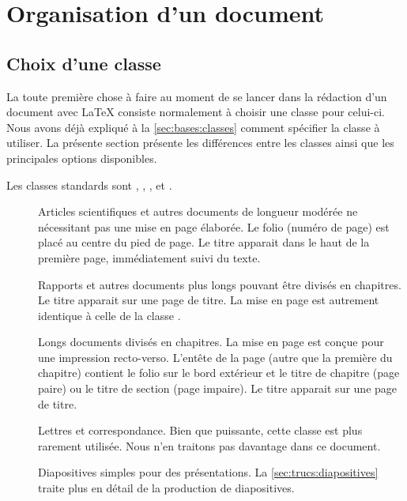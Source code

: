 \chapter{Organisation d'un document}
\label{chap:organisation}


\section{Choix d'une classe}
\label{sec:organisation:classe}

La toute première chose à faire au moment de se lancer dans la
rédaction d'un document avec {\LaTeX} consiste normalement à choisir
une classe pour celui-ci. Nous avons déjà expliqué à la
\autoref{sec:bases:classes} comment spécifier la classe à utiliser. La
présente section présente les différences entre les classes ainsi que
les principales options disponibles.

Les classes standards sont , ,
,  et .

\begin{description}
\item[\normalfont{}] Articles scientifiques et autres
  documents de longueur modérée ne nécessitant pas une mise en page
  élaborée. Le folio (numéro de page) est placé au centre du pied de
  page. Le titre apparait dans le haut de la première page,
  immédiatement suivi du texte.
\item[\normalfont{}] Rapports et autres documents plus
  longs pouvant être divisés en chapitres. Le titre apparait sur une
  page de titre. La mise en page est autrement identique à celle de la
  classe .
\item[\normalfont{}] Longs documents divisés en chapitres.
  La mise en page est conçue pour une impression recto-verso. L'entête
  de la page (autre que la première du chapitre) contient le folio sur
  le bord extérieur et le titre de chapitre (page paire) ou le titre
  de section (page impaire). Le titre apparait sur une page de titre.
\item[\normalfont{}] Lettres et correspondance. Bien que
  puissante, cette classe est plus rarement utilisée. Nous n'en traitons
  pas davantage dans ce document.
\item[\normalfont{}] Diapositives simples pour des
  présentations. La \autoref{sec:trucs:diapositives} traite plus en
  détail de la production de diapositives.
\end{description}

